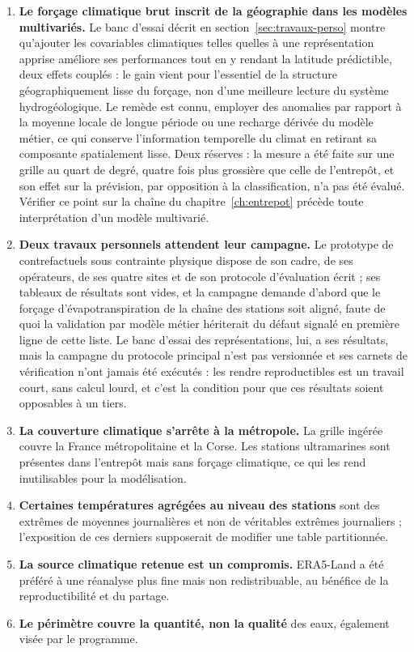 \begin{enumerate}
  \item \textbf{Le forçage climatique brut inscrit de la géographie dans les modèles
  multivariés.} Le banc d'essai décrit en section~\ref{sec:travaux-perso} montre qu'ajouter les
  covariables climatiques telles quelles à une représentation apprise améliore ses performances
  tout en y rendant la latitude prédictible, deux effets couplés : le gain vient pour l'essentiel
  de la structure géographiquement lisse du forçage, non d'une meilleure lecture du système
  hydrogéologique. Le remède est connu, employer des anomalies par rapport à la moyenne locale de
  longue période ou une recharge dérivée du modèle métier, ce qui conserve l'information
  temporelle du climat en retirant sa composante spatialement lisse. Deux réserves : la mesure a
  été faite sur une grille au quart de degré, quatre fois plus grossière que celle de l'entrepôt,
  et son effet sur la prévision, par opposition à la classification, n'a pas été évalué. Vérifier
  ce point sur la chaîne du chapitre~\ref{ch:entrepot} précède toute interprétation d'un modèle
  multivarié.

  \item \textbf{Deux travaux personnels attendent leur campagne.} Le prototype de
  contrefactuels sous contrainte physique dispose de son cadre, de ses opérateurs, de ses quatre
  sites et de son protocole d'évaluation écrit ; ses tableaux de résultats sont vides, et la
  campagne demande d'abord que le forçage d'évapotranspiration de la chaîne des stations soit
  aligné, faute de quoi la validation par modèle métier hériterait du défaut signalé en première
  ligne de cette liste. Le banc d'essai des représentations, lui, a ses résultats, mais la
  campagne du protocole principal n'est pas versionnée et ses carnets de vérification n'ont
  jamais été exécutés : les rendre reproductibles est un travail court, sans calcul lourd, et
  c'est la condition pour que ces résultats soient opposables à un tiers.

  \item \textbf{La couverture climatique s'arrête à la métropole.} La grille ingérée couvre la
  France métropolitaine et la Corse. Les stations ultramarines sont présentes dans l'entrepôt
  mais sans forçage climatique, ce qui les rend inutilisables pour la modélisation.

  \item \textbf{Certaines températures agrégées au niveau des stations} sont des extrêmes de
  moyennes journalières et non de véritables extrêmes journaliers ; l'exposition de ces derniers
  supposerait de modifier une table partitionnée.

  \item \textbf{La source climatique retenue est un compromis.} ERA5-Land a été préféré à une
  réanalyse plus fine mais non redistribuable, au bénéfice de la reproductibilité et du partage.

  \item \textbf{Le périmètre couvre la quantité, non la qualité} des eaux, également visée par
  le programme.
\end{enumerate}

